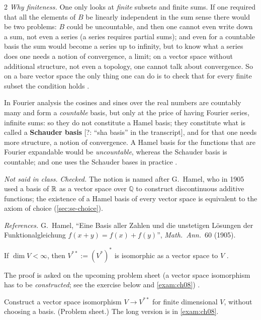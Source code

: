 \begin{paracol}{2}
\emph{Why finiteness.} One only looks at \emph{finite} subsets and finite sums. If one required that all the elements of $B$ be linearly independent in the sum sense there would be two problems: $B$ could be uncountable, and then one cannot even write down a sum, not even a series (a series requires partial sums);
and even for a countable basis the sum would become a series up to infinity, but to know what a series does one needs a notion of convergence, a limit; on a vector space without additional structure, not even a topology, one cannot talk about convergence. So on a bare vector space the only thing one can do is to check that for every finite
subset the condition holds .
\begin{example}\label{ex:te-fourier}
In Fourier analysis the cosines and sines over the real numbers are countably many and form a \emph{countable} basis, but only at the price of having Fourier series, infinite sums: so they do not constitute a Hamel basis; they constitute what is called a \textbf{Schauder basis} [?: ``sha basis'' in the transcript], and for that one needs
more structure, a notion of convergence. A Hamel basis for the functions that are Fourier expandable would be \emph{uncountable}, whereas the Schauder basis is countable; and one uses the Schauder bases in practice
.
\end{example}
\begin{history}[Hamel]
\emph{Not said in class.} \emph{Checked.} The notion is named after G.~Hamel, who in 1905 used a basis of $\mathbb{R}$ as a vector space over $\mathbb Q$ to construct discontinuous additive functions; the existence of a Hamel basis of every vector space is equivalent to the axiom of choice (\cref{sec:se-choice}).\par
\emph{References.} G.~Hamel, ``Eine Basis aller Zahlen und die unstetigen L\"osungen der Funktionalgleichung $f(x+y)=f(x)+f(y)$'', \emph{Math.\ Ann.}\ 60 (1905).
\end{history}

\begin{theorem}\label{thm:te-dd}
If $\dim V<\infty$, then $V^{**}:=(V^*)^*$ is isomorphic as a vector space to $V$
.
\end{theorem}
The proof is asked on the upcoming problem sheet (a vector space isomorphism has to be \emph{constructed}; see the exercise below and \cref{exam:ch08}) .
\begin{exercise}\label{ex:te-dd}
Construct a vector space isomorphism $V\to V^{**}$ for finite dimensional $V$, without choosing a basis. (Problem sheet.) The long version is in \cref{exam:ch08}.
\end{exercise}


\end{paracol}
